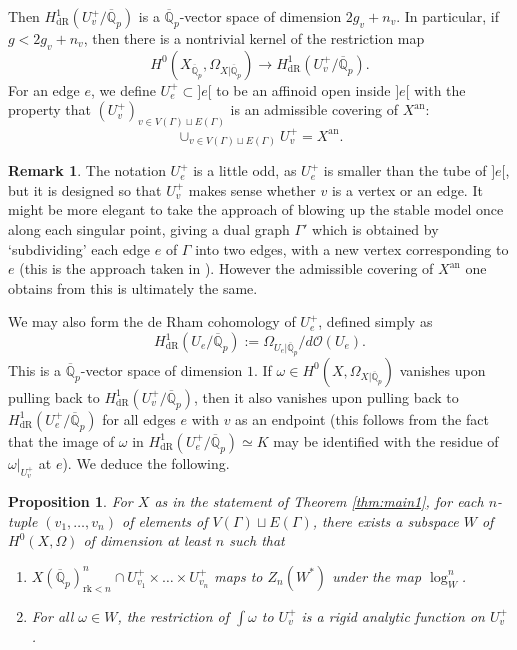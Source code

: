 \documentclass{amsart}
\def\Q{\mathbb Q}
\newcommand{\dR}{\mathrm{dR}}
\newcommand{\rk}{\mathrm{rk}}
\newcommand{\an}{\mathrm{an}}
\theoremstyle{plain}
\newtheorem{proposition}{Proposition}
\theoremstyle{definition}
\newtheorem{remark}{Remark}
\begin{document}
Then $H^1 _{\dR}(U_v ^+ /\overline{\Q }_p)$ is a $\overline{\Q }_p$-vector space of dimension $2g_v +n_v $. In particular, if $g<2g_v +n_v$, then there is a nontrivial kernel of the restriction map
\[
H^0 (X_{\overline{\Q }_p },\Omega _{X|\overline{\Q }_p } )\to H^1 _{\dR}(U_v ^+ /\overline{\Q }_p ).
\]
For an edge $e$, we define $U_e ^+ \subset ]e[$ to be an affinoid open inside $]e[$ with the property that $(U_v ^+ )_{v\in V(\Gamma )\sqcup E(\Gamma )}$ is an admissible covering of $X^{\an }$:
\[
\cup _{v\in V(\Gamma )\sqcup E(\Gamma )}U_v ^+ =X^{\an }.
\]
\begin{remark}
The notation $U_e ^+$ is a little odd, as $U_e ^+ $ is smaller than the tube of $]e[$, but it is designed so that $U_v ^+$ makes sense whether $v$ is a vertex or an edge. It might be more elegant to take the approach of blowing up the stable model once along each singular point, giving a dual graph $\Gamma  '$ which is obtained by `subdividing' each edge $e$ of $\Gamma $ into two edges, with a new vertex corresponding to $e$ (this is the approach taken in \cite[Proof of Theorem 5.5]{KRB}). However the admissible covering of $X^{\an}$ one obtains from this is ultimately the same.
\end{remark}
We may also form the de Rham cohomology of $U_e ^+ $, defined simply as
\[
H^1 _{\dR}(U_e /\overline{\Q }_p):=\Omega _{U_e |\overline{\Q }_p}/d\mathcal{O}(U_e ).
\]
This is a $\overline{\Q }_p$-vector space of dimension $1$. If $\omega \in H^0 (X,\Omega _{X|\overline{\Q }_p})$ vanishes upon pulling back to $H^1 _{\dR}(U_v ^+ /\overline{\Q }_p)$, then it also vanishes upon pulling back to $H^1 _{\dR}(U_e ^+ /\overline{\Q }_p)$ for all edges $e$ with $v$ as an endpoint (this follows from the fact that the image of $\omega $ in $H^1 _{\dR}(U_e ^+ /\overline{\Q }_p)\simeq K$ may be identified with the residue of $\omega |_{U_v ^+ }$ at $e$). We deduce the following.
\begin{proposition}\label{prop1}
For $X$ as in the statement of Theorem \ref{thm:main1}, for each $n$-tuple $(v_1 ,\ldots ,v_n )$ of elements of $V(\Gamma ) \sqcup E(\Gamma )$, there exists a subspace $W$ of $H^0 (X,\Omega )$ of dimension at least $n$ such that
\begin{enumerate}
\item $X(\overline{\Q }_p )^n _{\rk <n} \cap U_{v_1 }^+ \times \ldots \times U_{v_n }^+ $ maps to $Z_n (W^* )$ under the map $\log _{W}^n $.
\item For all $\omega \in W$, the restriction of $\int \omega $ to $U_v ^+ $ is a rigid analytic function on $U_v ^+ $.
\end{enumerate}
\end{proposition}
\end{document}
